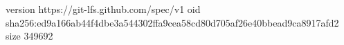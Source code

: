 version https://git-lfs.github.com/spec/v1
oid sha256:ed9a166ab44f4dbe3a544302ffa9cea58cd80d705af26e40bbead9ca8917afd2
size 349692
